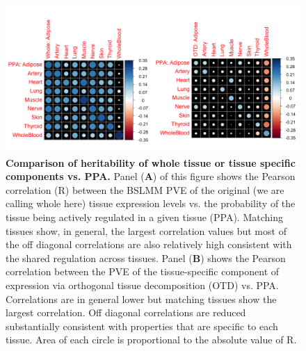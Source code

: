\documentclass[10pt,letterpaper]{article}
\begin{document}



\begin{figure}[H]
\includegraphics[width=12cm]{Figures/Fig-cor-StephensPr-v-PVE.png}
\caption{{\bf Comparison of heritability of whole tissue or tissue specific components vs. PPA.} 
Panel (\textbf{A}) of this figure shows the Pearson correlation (R) between the BSLMM PVE of the original (we are calling whole here) tissue expression levels vs. the probability of the tissue being actively regulated in a given tissue (PPA). Matching tissues show, in general, the largest correlation values but most of the off diagonal correlations are also relatively high consistent with the shared regulation across tissues. 
Panel (\textbf{B}) shows the Pearson correlation between the PVE of the tissue-specific component of expression via orthogonal tissue decomposition (OTD) vs. PPA. Correlations are in general lower but matching tissues show the largest correlation. Off diagonal correlations are reduced substantially consistent with properties that are specific to each tissue. 
Area of each circle is proportional to the absolute value of R.
}
\label{fig-corrplot}
\end{figure}
\end{document}
